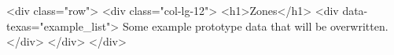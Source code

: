 <div class="row">
  <div class="col-lg-12">
    <h1>Zones</h1>
    <div data-texas="example_list">
      Some example prototype data that will be overwritten.
    </div>
  </div>
</div>
